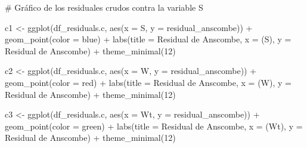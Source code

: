 \documentclass[
  letterpaper,
  DIV=11,
  numbers=noendperiod]{scrartcl}
\newenvironment{Shaded}{\begin{snugshade}}{\end{snugshade}}
\newcommand{\AttributeTok}[1]{\textcolor[rgb]{0.40,0.45,0.13}{#1}}
\newcommand{\CommentTok}[1]{\textcolor[rgb]{0.37,0.37,0.37}{#1}}
\newcommand{\DecValTok}[1]{\textcolor[rgb]{0.68,0.00,0.00}{#1}}
\newcommand{\FunctionTok}[1]{\textcolor[rgb]{0.28,0.35,0.67}{#1}}
\newcommand{\NormalTok}[1]{\textcolor[rgb]{0.00,0.23,0.31}{#1}}
\newcommand{\OtherTok}[1]{\textcolor[rgb]{0.00,0.23,0.31}{#1}}
\newcommand{\SpecialCharTok}[1]{\textcolor[rgb]{0.37,0.37,0.37}{#1}}
\newcommand{\StringTok}[1]{\textcolor[rgb]{0.13,0.47,0.30}{#1}}
\begin{document}
\begin{Shaded}
\begin{Highlighting}[]
\CommentTok{\# Gráfico de los residuales crudos contra la variable S}

\NormalTok{c1 }\OtherTok{\textless{}{-}} \FunctionTok{ggplot}\NormalTok{(df\_residuals.c, }\FunctionTok{aes}\NormalTok{(}\AttributeTok{x =}\NormalTok{ S, }\AttributeTok{y =}\NormalTok{ residual\_anscombe)) }\SpecialCharTok{+}
    \FunctionTok{geom\_point}\NormalTok{(}\AttributeTok{color =} \StringTok{\textquotesingle{}blue\textquotesingle{}}\NormalTok{) }\SpecialCharTok{+}
    \FunctionTok{labs}\NormalTok{(}\AttributeTok{title =} \StringTok{\textquotesingle{}Residual de Anscombe\textquotesingle{}}\NormalTok{, }\AttributeTok{x =} \StringTok{\textquotesingle{}(S)\textquotesingle{}}\NormalTok{, }\AttributeTok{y =} \StringTok{\textquotesingle{}Residual de Anscombe\textquotesingle{}}\NormalTok{) }\SpecialCharTok{+}
    \FunctionTok{theme\_minimal}\NormalTok{(}\DecValTok{12}\NormalTok{)}

\NormalTok{c2 }\OtherTok{\textless{}{-}} \FunctionTok{ggplot}\NormalTok{(df\_residuals.c, }\FunctionTok{aes}\NormalTok{(}\AttributeTok{x =}\NormalTok{ W, }\AttributeTok{y =}\NormalTok{ residual\_anscombe)) }\SpecialCharTok{+}
    \FunctionTok{geom\_point}\NormalTok{(}\AttributeTok{color =} \StringTok{\textquotesingle{}red\textquotesingle{}}\NormalTok{) }\SpecialCharTok{+}
    \FunctionTok{labs}\NormalTok{(}\AttributeTok{title =} \StringTok{\textquotesingle{}Residual de Anscombe\textquotesingle{}}\NormalTok{, }\AttributeTok{x =} \StringTok{\textquotesingle{}(W)\textquotesingle{}}\NormalTok{, }\AttributeTok{y =} \StringTok{\textquotesingle{}Residual de Anscombe\textquotesingle{}}\NormalTok{) }\SpecialCharTok{+}
    \FunctionTok{theme\_minimal}\NormalTok{(}\DecValTok{12}\NormalTok{)}

\NormalTok{c3 }\OtherTok{\textless{}{-}} \FunctionTok{ggplot}\NormalTok{(df\_residuals.c, }\FunctionTok{aes}\NormalTok{(}\AttributeTok{x =}\NormalTok{ Wt, }\AttributeTok{y =}\NormalTok{ residual\_anscombe)) }\SpecialCharTok{+}
    \FunctionTok{geom\_point}\NormalTok{(}\AttributeTok{color =} \StringTok{\textquotesingle{}green\textquotesingle{}}\NormalTok{) }\SpecialCharTok{+}
    \FunctionTok{labs}\NormalTok{(}\AttributeTok{title =} \StringTok{\textquotesingle{}Residual de Anscombe\textquotesingle{}}\NormalTok{, }\AttributeTok{x =} \StringTok{\textquotesingle{}(Wt)\textquotesingle{}}\NormalTok{, }\AttributeTok{y =} \StringTok{\textquotesingle{}Residual de Anscombe\textquotesingle{}}\NormalTok{) }\SpecialCharTok{+}
    \FunctionTok{theme\_minimal}\NormalTok{(}\DecValTok{12}\NormalTok{)}


\end{Highlighting}
\end{Shaded}
\end{document}
